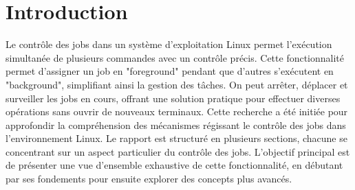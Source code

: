 \section{Introduction}
Le contrôle des jobs dans un système d'exploitation Linux permet l'exécution simultanée de plusieurs commandes avec un contrôle précis. Cette fonctionnalité permet d'assigner un job en "foreground" pendant que d'autres s'exécutent en "background", simplifiant ainsi la gestion des tâches. On peut arrêter, déplacer et surveiller les jobs en cours, offrant une solution pratique pour effectuer diverses opérations sans ouvrir de nouveaux terminaux.
\newline
Cette recherche a été initiée pour approfondir la compréhension des mécanismes régissant le contrôle des jobs dans l'environnement Linux. Le rapport est structuré en plusieurs sections, chacune se concentrant sur un aspect particulier du contrôle des jobs. L'objectif principal est de présenter une vue d'ensemble exhaustive de cette fonctionnalité, en débutant par ses fondements pour ensuite explorer des concepts plus avancés.
\newline
